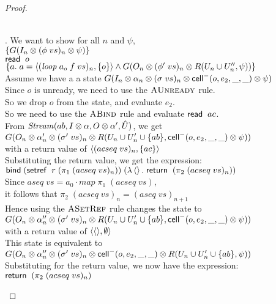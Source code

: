 \begin{proof}
\begin{enumerate}
\begin{tabbedproof}
  \\ . We want to show for all $n$ and $\psi$, \\
  \ooox $\{{G(I_n \otimes (\phi\;vs)_n \otimes \psi)}\}$ \\
  \ooox $\mathsf{read}\;\;o$ \\
  \ooox $\{{a.\;a = \left<{(\mathit{loop}\;a_o\;f\;vs)_n},{\{{o}\}}\right> \land G(O_n \otimes (\phi'\;vs)_n \otimes R(U_n \cup U''_n, \psi))}\}$ \\
  \ooo Assume we have a a state $G(I_n \otimes \alpha_n \otimes (\sigma\;vs)_n \otimes \mathsf{cell}^{-}({o}, {e_2}, {\_}, {\_}) \otimes \psi)$ \\
  \ooo Since $o$ is unready, we need to use the $\textsc{AUnready}$ rule. \\
  \ooo So we drop $o$ from the state, and evaluate $e_2$. \\ 
  \ooo So we need to use the $\textsc{ABind}$ rule and evaluate $\mathsf{read}\;\;ac$. \\
  \ooo From $\mathit{Stream}(ab, I \otimes \alpha, O \otimes \alpha', \hat{U})$, we get \\
  \oooo $G(O_n \otimes \alpha'_n \otimes (\sigma'\;vs)_n \otimes R(U_n \cup U'_n \cup \{{ab}\}, \mathsf{cell}^{-}({o}, {e_2}, {\_}, {\_}) \otimes \psi))$ \\
  \ooo with a return value of $\left<{(acseq\;vs)_n},{\{{ac}\}}\right>$ \\ 
  \ooo Substituting the return value, we get the expression: \\
  \oooo $\mathsf{bind}\; (\mathsf{setref}\;\;r\;(\pi_1\;(acseq\;vs)_n))\; (\lambda \left<\right>.\;\mathsf{return}\;\;(\pi_2\;(acseq\;vs)_n))$ \\
  \ooo Since $aseq\;vs = a_0 \cdot \mathit{map}\;\pi_1\;(acseq\;vs)$, \\
  \ooo it follows that $\pi_2\;(acseq\;vs)_n = (aseq\;vs)_{n+1}$ \\
  \ooo Hence using the $\textsc{ASetRef}$ rule changes the state to \\
  \oooo $G(O_n \otimes \alpha''_n \otimes (\sigma'\;vs)_n \otimes R(U_n \cup U'_n \cup \{{ab}\}, \mathsf{cell}^{-}({o}, {e_2}, {\_}, {\_}) \otimes \psi))$ \\
  \ooo with a return value of $\left<{\left<\right>},{\emptyset}\right>$ \\ 
  \ooo This state is equivalent to \\
  \oooo $G(O_n \otimes \alpha''_n \otimes (\sigma'\;vs)_n \otimes \mathsf{cell}^{-}({o}, {e_2}, {\_}, {\_}) \otimes R(U_n \cup U'_n \cup \{{ab}\}, \psi))$ \\
  \ooo Substituting for the return value, we now have the expression: \\
  \oooo $\mathsf{return}\;\;(\pi_2\;(acseq\;vs)_n)$ \\

\end{tabbedproof}
\end{enumerate}
\end{proof}
